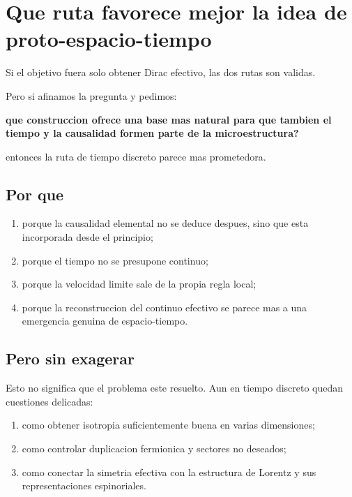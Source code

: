 \section{Que ruta favorece mejor la idea de proto-espacio-tiempo}
Si el objetivo fuera solo obtener Dirac efectivo, las dos rutas son validas.

Pero si afinamos la pregunta y pedimos:
\begin{displayquote}
\textbf{que construccion ofrece una base mas natural para que tambien el tiempo y la causalidad formen parte de la microestructura?}
\end{displayquote}

entonces la ruta de tiempo discreto parece mas prometedora.

\subsection{Por que}
\begin{enumerate}[label=\arabic*.]
    \item porque la causalidad elemental no se deduce despues, sino que esta incorporada desde el principio;
    \item porque el tiempo no se presupone continuo;
    \item porque la velocidad limite sale de la propia regla local;
    \item porque la reconstruccion del continuo efectivo se parece mas a una emergencia genuina de espacio-tiempo.
\end{enumerate}

\subsection{Pero sin exagerar}
Esto no significa que el problema este resuelto. Aun en tiempo discreto quedan cuestiones delicadas:
\begin{enumerate}[label=\arabic*.]
    \item como obtener isotropia suficientemente buena en varias dimensiones;
    \item como controlar duplicacion fermionica y sectores no deseados;
    \item como conectar la simetria efectiva con la estructura de Lorentz y sus representaciones espinoriales.
\end{enumerate}

